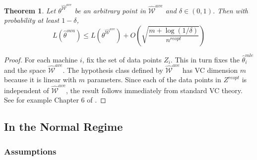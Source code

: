 \documentclass[twoside]{article}
\newtheorem{theorem}{Theorem}
\newcommand{\zero}{\text{\textbf{0}}}
\newcommand{\Wave}{{\mathcal{\hat W}^{ave}}}
\newcommand{\w}{\theta}
\newcommand{\wreopt}{\hat\w^{owa}}
\newcommand{\wmle}{\hat\w^{mle}}
\newcommand{\wstar}{{\w^{*}}}
\newcommand{\I}{\mathcal I}
\newcommand{\normal}[2]{\ensuremath{\mathcal{N}\left({{#1}},{{#2}}\right)}}
\newcommand{\fixme}[1]{\textbf{FIXME:} {#1}}
\begin{document}
\begin{theorem}
Let $\w^\Wave$ be an arbitrary point in $\Wave$ and $\delta\in(0,1)$.
Then with probability at least $1-\delta$,
\begin{equation}
L(\wreopt) \le L(\w^\Wave) + O\left(\sqrt{\frac{m + \log(1/\delta)}{n^{reopt}}}\right)
\end{equation}
\end{theorem}
\begin{proof}
For each machine $i$, fix the set of data points $Z_i$.
This in turn fixes the $\wmle_i$ and the space $\Wave$.
The hypothesis class defined by $\Wave$ has VC dimension $m$ because it is linear with $m$ parameters.
Since each of the data points in $Z^{reopt}$ is independent of $\Wave$,
the result follows immediately from standard VC theory.
See for example Chapter 6 of \cite{shalev2014understanding}.
%
\end{proof}

\subsection{In the Normal Regime}
%

\subsubsection{Assumptions}
\end{document}
